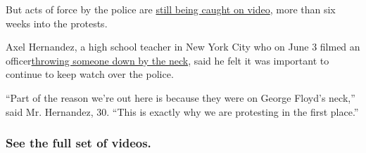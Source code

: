 But acts of force by the police are
\href{https://twitter.com/ScooterCasterNY/status/1282464495839981569}{still
being caught on video}, more than six weeks into the protests.

Axel Hernandez, a high school teacher in New York City who on June 3
filmed an
officer\href{https://twitter.com/Axelohh/status/1268649155595055104}{}\href{https://twitter.com/Axelohh/status/1268649155595055104}{throwing
someone down by the neck}, said he felt it was important to continue to
keep watch over the police.

``Part of the reason we're out here is because they were on George
Floyd's neck,'' said Mr. Hernandez, 30. ``This is exactly why we are
protesting in the first place.''

\hypertarget{see-the-full-set-of-videos}{%
\subsubsection{See the full set of
videos.}\label{see-the-full-set-of-videos}}

